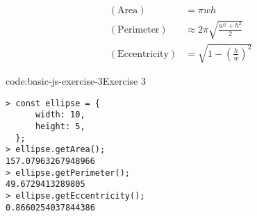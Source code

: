 $$ \begin{aligned}
    (\mathrm{Area}) &= \pi w h \\
    (\mathrm{Perimeter}) &\approx 2 \pi \sqrt{\frac{w^2 + h^2} 2} \\
    (\mathrm{Eccentricity}) &= \sqrt{1 - \left( \frac h w \right)^2}
\end{aligned} $$

\begin{codeenv}{code:basic-js-exercise-3}{Exercise 3}\begin{verbatim}
> const ellipse = {
      width: 10,
      height: 5,
  };
> ellipse.getArea();
157.07963267948966
> ellipse.getPerimeter();
49.6729413289805
> ellipse.getEccentricity();
0.8660254037844386
\end{verbatim}
\end{codeenv}
